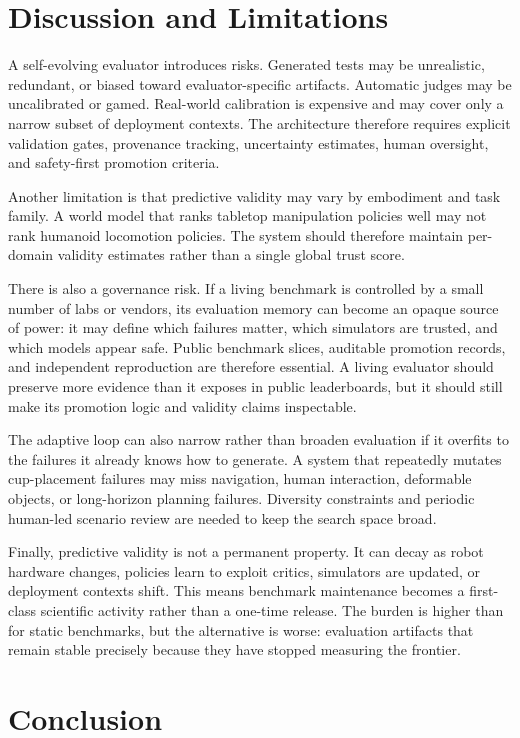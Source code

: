 \documentclass[sigconf,review,anonymous]{acmart}
\begin{document}
\section{Discussion and Limitations}

A self-evolving evaluator introduces risks. Generated tests may be unrealistic, redundant, or biased toward evaluator-specific artifacts. Automatic judges may be uncalibrated or gamed. Real-world calibration is expensive and may cover only a narrow subset of deployment contexts. The architecture therefore requires explicit validation gates, provenance tracking, uncertainty estimates, human oversight, and safety-first promotion criteria.

Another limitation is that predictive validity may vary by embodiment and task family. A world model that ranks tabletop manipulation policies well may not rank humanoid locomotion policies. The system should therefore maintain per-domain validity estimates rather than a single global trust score.

There is also a governance risk. If a living benchmark is controlled by a small number of labs or vendors, its evaluation memory can become an opaque source of power: it may define which failures matter, which simulators are trusted, and which models appear safe. Public benchmark slices, auditable promotion records, and independent reproduction are therefore essential. A living evaluator should preserve more evidence than it exposes in public leaderboards, but it should still make its promotion logic and validity claims inspectable.

The adaptive loop can also narrow rather than broaden evaluation if it overfits to the failures it already knows how to generate. A system that repeatedly mutates cup-placement failures may miss navigation, human interaction, deformable objects, or long-horizon planning failures. Diversity constraints and periodic human-led scenario review are needed to keep the search space broad.

Finally, predictive validity is not a permanent property. It can decay as robot hardware changes, policies learn to exploit critics, simulators are updated, or deployment contexts shift. This means benchmark maintenance becomes a first-class scientific activity rather than a one-time release. The burden is higher than for static benchmarks, but the alternative is worse: evaluation artifacts that remain stable precisely because they have stopped measuring the frontier.

\section{Conclusion}
\end{document}
